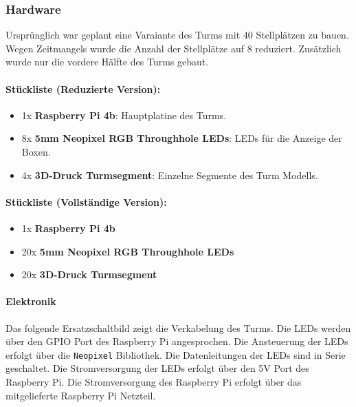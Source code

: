 \subsubsection{Hardware}

Ursprünglich war geplant eine Varaiante des Turms mit 40 Stellplätzen zu bauen. Wegen Zeitmangels wurde die Anzahl der Stellplätze auf 8 reduziert. Zusätzlich wurde nur die vordere Hälfte des Turms gebaut.

\paragraph{Stückliste (Reduzierte Version):}
\begin{itemize}
  \item 1x \textbf{Raspberry Pi 4b}: Hauptplatine des Turms.
  \item 8x \textbf{5mm Neopixel RGB Throughhole LEDs}: LEDs für die Anzeige der Boxen.
  \item 4x \textbf{3D-Druck Turmsegment}: Einzelne Segmente des Turm Modells.
\end{itemize}

\paragraph{Stückliste (Vollständige Version):}
\begin{itemize}
  \item 1x \textbf{Raspberry Pi 4b}
  \item 20x \textbf{5mm Neopixel RGB Throughhole LEDs}
  \item 20x \textbf{3D-Druck Turmsegment}
\end{itemize}

\clearpage

\paragraph{Elektronik}

Das folgende Ersatzschaltbild zeigt die Verkabelung des Turms. Die LEDs werden über den GPIO Port des Raspberry Pi angesprochen. Die Ansteuerung der LEDs erfolgt über die \texttt{Neopixel} Bibliothek. Die Datenleitungen der LEDs sind in Serie geschaltet. Die Stromversorgung der LEDs erfolgt über den 5V Port des Raspberry Pi. Die Stromversorgung des Raspberry Pi erfolgt über das mitgelieferte Raspberry Pi Netzteil.

